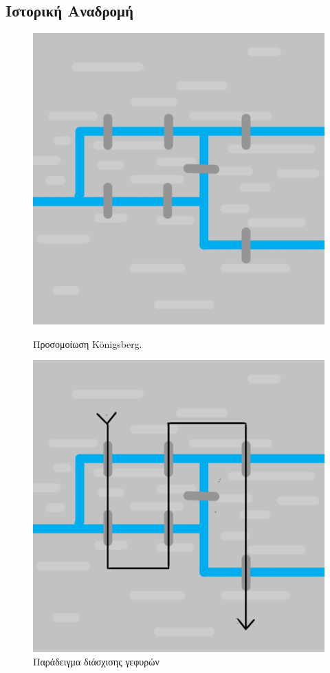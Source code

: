 \subsection{Ιστορική Αναδρομή}
\begin{figure}[ht]
    \begin{minipage}[c]{.46\linewidth}
        \centering
        \includegraphics[scale=0.15]{2947_thesis/pictures/konigsberg.png}
        \caption{Προσομοίωση Königsberg.}
        \label{1}
    \end{minipage}
    \hfill%
    \begin{minipage}[c]{.46\linewidth}
        \centering
        \includegraphics[scale=0.15]{2947_thesis/pictures/konigsbergEx.png} 
        \caption{Παράδειγμα διάσχισης γεφυρών}
        \label{2}
    \end{minipage}
\end{figure}

